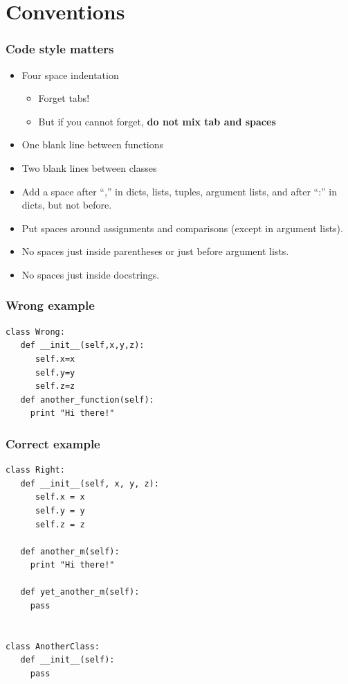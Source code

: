 \documentclass[11pt]{beamer}
\begin{document}
\section{Conventions}
\label{sec-2}
\begin{frame}[fragile]\frametitle{Code style matters}
\label{sec-2_1}


\begin{itemize}
\item Four space indentation

\begin{itemize}
\item Forget tabs!
\item But if you cannot forget, \textbf{do not mix tab and spaces}
\end{itemize}

\item One blank line between functions
\item Two blank lines between classes
\item Add a space after ``,'' in dicts, lists, tuples, argument lists, and
  after ``:'' in dicts, but not before.
\item Put spaces around assignments and comparisons (except in argument
  lists).
\item No spaces just inside parentheses or just before argument lists.
\item No spaces just inside docstrings.
\end{itemize}
\end{frame}
\begin{frame}[fragile]\frametitle{Wrong example}
\label{sec-2_2}


\begin{lstlisting}
class Wrong:
   def __init__(self,x,y,z):
      self.x=x
      self.y=y
      self.z=z
   def another_function(self):
     print "Hi there!"
\end{lstlisting}
\end{frame}
\begin{frame}[fragile]\frametitle{Correct example}
\label{sec-2_3}


\begin{lstlisting}
class Right:
   def __init__(self, x, y, z):
      self.x = x
      self.y = y
      self.z = z

   def another_m(self):
     print "Hi there!"

   def yet_another_m(self):
     pass


class AnotherClass:
   def __init__(self):
     pass
\end{lstlisting}
\end{frame}
\end{document}
